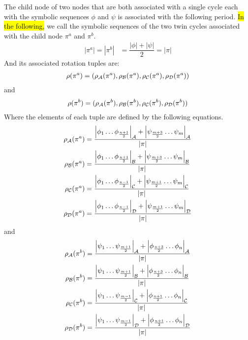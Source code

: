 \begin{theorem}
	The child node of two nodes that are both associated with a single cycle each with the symbolic sequences $\phi$ and $\psi$ is associated with the following period.
	\hl{In the following,} we call the symbolic sequences of the two twin cycles associated with the child node $\pi^a$ and $\pi^b$.
	\begin{align}
		|\pi^a| = |\pi^b| & = \dfrac{|\phi| + |\psi|}{2} = |\pi|
	\end{align}
	And its associated rotation tuples are:
	\begin{align}
		\rho(\pi^a) = (\rho_{\mathcal{A}}(\pi^a), \rho_{\mathcal{B}}(\pi^a), \rho_{\mathcal{C}}(\pi^a), \rho_{\mathcal{D}}(\pi^a))
	\end{align}
	and
	\begin{align}
		\rho(\pi^b) = (\rho_{\mathcal{A}}(\pi^b), \rho_{\mathcal{B}}(\pi^b), \rho_{\mathcal{C}}(\pi^b), \rho_{\mathcal{D}}(\pi^b))
	\end{align}
	Where the elements of each tuple are defined by the following equations.
	\begin{subequations}
		\begin{align}
			\rho_{\mathcal{A}}(\pi^a) & = \dfrac{\left|\phi_1 \dots \phi_{\frac{n+1}{2}}\right|_{\mathcal{A}} + \left|\psi_{\frac{m+3}{2}} \dots \psi_m\right|_{\mathcal{A}}}{|\pi|} \\
			\rho_{\mathcal{B}}(\pi^a) & = \dfrac{\left|\phi_1 \dots \phi_{\frac{n+1}{2}}\right|_{\mathcal{B}} + \left|\psi_{\frac{m+3}{2}} \dots \psi_m\right|_{\mathcal{B}}}{|\pi|} \\
			\rho_{\mathcal{C}}(\pi^a) & = \dfrac{\left|\phi_1 \dots \phi_{\frac{n-1}{2}}\right|_{\mathcal{C}} + \left|\psi_{\frac{m+1}{2}} \dots \psi_m\right|_{\mathcal{C}}}{|\pi|} \\
			\rho_{\mathcal{D}}(\pi^a) & = \dfrac{\left|\phi_1 \dots \phi_{\frac{n-1}{2}}\right|_{\mathcal{D}} + \left|\psi_{\frac{m+1}{2}} \dots \psi_m\right|_{\mathcal{D}}}{|\pi|}
		\end{align}
	\end{subequations}
	and
	\begin{subequations}
		\begin{align}
			\rho_{\mathcal{A}}(\pi^b) & = \dfrac{\left|\psi_1 \dots \psi_{\frac{m+1}{2}}\right|_{\mathcal{A}} + \left|\phi_{\frac{n+3}{2}} \dots \phi_n\right|_{\mathcal{A}}}{|\pi|} \\
			\rho_{\mathcal{B}}(\pi^b) & = \dfrac{\left|\psi_1 \dots \psi_{\frac{m+1}{2}}\right|_{\mathcal{B}} + \left|\phi_{\frac{n+3}{2}} \dots \phi_n\right|_{\mathcal{B}}}{|\pi|} \\
			\rho_{\mathcal{C}}(\pi^b) & = \dfrac{\left|\psi_1 \dots \psi_{\frac{m-1}{2}}\right|_{\mathcal{C}} + \left|\phi_{\frac{n+1}{2}} \dots \phi_n\right|_{\mathcal{C}}}{|\pi|} \\
			\rho_{\mathcal{D}}(\pi^b) & = \dfrac{\left|\psi_1 \dots \psi_{\frac{m-1}{2}}\right|_{\mathcal{D}} + \left|\phi_{\frac{n+1}{2}} \dots \phi_n\right|_{\mathcal{D}}}{|\pi|}
		\end{align}
	\end{subequations}
\end{theorem}

